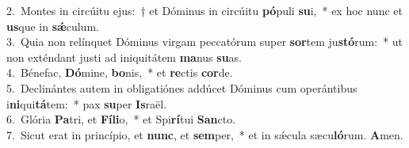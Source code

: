 {2.~}Montes in circúitu ejus:~† et Dóminus in circúitu \textbf{pó}puli \textbf{su}i,~* ex hoc nunc et \textbf{us}que in \textbf{sǽ}culum.\\
{3.~}Quia non relínquet Dóminus virgam peccatórum super \textbf{sor}tem ju\textbf{stó}rum:~* ut non exténdant justi ad iniquitátem \textbf{ma}nus \textbf{su}as.\\
{4.~}Bénefac, \textbf{Dó}mine, \textbf{bo}nis,~* et \textbf{re}ctis \textbf{cor}de.\\
{5.~}Declinántes autem in obligatiónes addúcet Dóminus cum operántibus i\textbf{ni}qui\textbf{tá}tem:~* pax \textbf{su}per \textbf{Is}raël.\\
{6.~}Glória \textbf{Pa}tri, et \textbf{Fí}\textbf{li}o,~* et Spi\textbf{rí}tui \textbf{San}cto.\\
{7.~}Sicut erat in princípio, et \textbf{nunc}, et \textbf{sem}per,~* et in sǽcula sæcu\textbf{ló}rum. \textbf{A}men.\\
